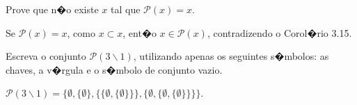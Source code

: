 \begin{exercicio}
	Prove que n�o existe $x$ tal que $\mathcal{P}(x)=x$.
\end{exercicio}
\begin{solucao}
	Se $\mathcal{P}(x)=x$, como $x\subset x$, ent�o $x\in \mathcal{P}(x)$, contradizendo o Corol�rio 3.15.
\end{solucao}

\begin{exercicio}
	Escreva o conjunto $\mathcal{P}(3\backslash 1)$, utilizando apenas os seguintes s�mbolos: as chaves, a v�rgula e o s�mbolo de conjunto vazio.
\end{exercicio}
\begin{solucao}
	$\mathcal{P}(3\backslash 1)=\{\emptyset,\{\emptyset\},\{\{\emptyset,\{\emptyset\}\}\},\{\emptyset,\{\emptyset,\{\emptyset\}\}\}\}$.
\end{solucao}

